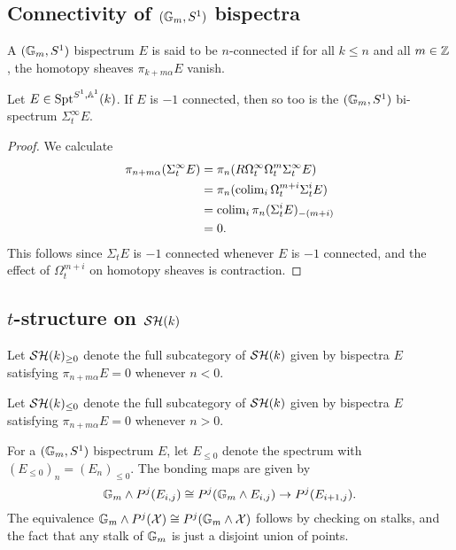 \documentclass{amsart}%
\begin{document}
\subsection{Connectivity of $(\mathbb{G}_m, S^1)$ bispectra}

\begin{definition}
  A $(\mathbb{G}_m, S^1)$ bispectrum $E$ is said to be $n$-connected if for
  all $k\leq n$ and all $m \in \mathbb{Z}$, the homotopy sheaves
  $\pi_{k + m\alpha}E$ vanish.
\end{definition}

\begin{proposition}
  Let $E \in \mathrm{Spt}^{S^1,\mathbb{A}^1}(k)$. If $E$ is $-1$ connected, then so
  too is the $(\mathbb{G}_m,S^1)$ bi-spectrum $\Sigma^{\infty}_t E$.
\end{proposition}

\begin{proof}
  We calculate
  \begin{align*}
    \pi_{n+m\alpha}(\Sigma^{\infty}_t E) 
    & = \pi_n(R\Omega^{\infty}_t\Omega_t^m \Sigma^{\infty}_t E) \\ 
    & = \pi_n (\operatorname{colim}_i \Omega_t^{m+i}\Sigma_t^{i} E) \\
    & = \operatorname{colim}_i \pi_n (\Sigma_t^{i}E)_{-(m+i)}\\
    & = 0.
  \end{align*}
  This follows since $\Sigma_tE$ is $-1$ connected whenever $E$ is
  $-1$ connected, and the effect of $\Omega_t^{m+i}$ on homotopy
  sheaves is contraction.
\end{proof}

\subsection{$t$-structure on $\mathcal{SH}(k)$}

\begin{definition}
  Let $\mathcal{SH}(k)_{\geq 0}$ denote the full subcategory of $\mathcal{SH}(k)$ given
  by bispectra $E$ satisfying $\pi_{n+m\alpha}E = 0 $ whenever
  $n < 0$.

  Let $\mathcal{SH}(k)_{\leq 0}$ denote the full subcategory of $\mathcal{SH}(k)$ given
  by bispectra $E$ satisfying $\pi_{n+m\alpha}E = 0$ whenever $n >0$. 
\end{definition}

\begin{definition}
  For a $(\mathbb{G}_m, S^1)$ bispectrum $E$, let $E_{\leq 0}$ denote the
  spectrum with $(E_{\leq 0})_n = (E_n)_{\leq 0}$. The bonding maps
  are given by 
  \begin{equation*}
    \mathbb{G}_m \wedge P^j(E_{i,j}) \cong P^j( \mathbb{G}_m \wedge E_{i,j}) \to P^j( E_{i+1,j}).
  \end{equation*}
  The equivalence
  $\mathbb{G}_m \wedge P^j(\mathcal{X}) \cong P^j(\mathbb{G}_m\wedge \mathcal{X})$ follows by
  checking on stalks, and the fact that any stalk of $\mathbb{G}_m$ is just
  a disjoint union of points. 
\end{definition}
\end{document}
